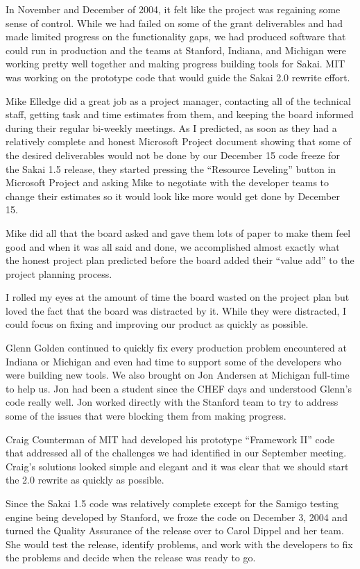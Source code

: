\documentclass[12pt]{book}
\begin{document}
In November and December of 2004, it felt like the project
was regaining some sense of control.  While we had failed
on some of the grant deliverables and had made
limited progress on the functionality gaps, we had
produced software that could run in production and the
teams at Stanford, Indiana, and Michigan were working
pretty well together and making progress building
tools for Sakai. MIT was working on the prototype code
that would guide the Sakai 2.0 rewrite effort.

Mike Elledge did a great job as a project manager,
contacting all of the technical staff,
getting task and time estimates from them, and
keeping the board informed during their regular
bi-weekly meetings.  As I predicted, as
soon as they had a relatively complete and honest
Microsoft Project document showing that
some of the desired deliverables would not be done
by our December 15 code freeze for the Sakai 1.5
release, they started pressing the ``Resource
Leveling'' button in Microsoft Project and asking
Mike to negotiate with the developer teams to
change their estimates so it would look like
more would get done by December 15.

Mike did all that the board asked and gave
them lots of paper to make them feel good and
when it was all said and done, we accomplished
almost exactly what the honest project plan
predicted before the board added their
``value add'' to the project planning process.

I rolled my eyes at the amount of time the board
wasted on the project plan but loved the fact that
the board was distracted by it.  While they were
distracted, I could focus on fixing
and improving our product as quickly as possible.

Glenn Golden continued to quickly fix every production
problem encountered at Indiana or Michigan and
even had time to support some of the developers who
were building new tools.  We also brought on
Jon Andersen at Michigan full-time to help us.
Jon had been a student since the CHEF days
and understood Glenn's code really well.
Jon worked directly with the Stanford
team to try to address some of the issues
that were blocking them from making progress.

Craig Counterman of MIT had developed his prototype
``Framework II'' code that addressed all of the
challenges we had identified in our September
meeting.  Craig's solutions looked
simple and elegant and it was clear that
we should start the 2.0 rewrite as quickly
as possible.

Since the Sakai 1.5 code was relatively complete
except for the Samigo testing engine being
developed by Stanford, we froze the code
on December 3, 2004 and turned the Quality
Assurance of the release over to Carol
Dippel and her team.  She would test the release,
identify problems, and work with the developers
to fix the problems and decide when the release
was ready to go.
\end{document}
